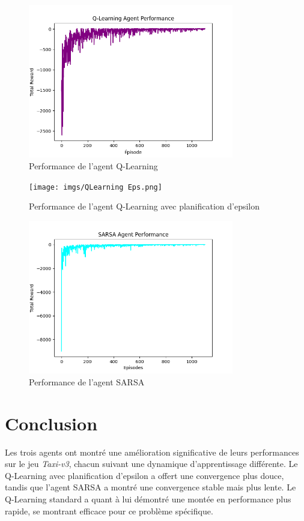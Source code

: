 \documentclass{article}
\begin{document}
\begin{figure}[H]
    \centering
    \includegraphics[width=0.8\textwidth]{imgs/QLearningAgent.png}
    \caption{Performance de l'agent Q-Learning}
\end{figure}

\begin{figure}[H]
    \centering
    \texttt{[image: imgs/QLearning Eps.png]}
    \caption{Performance de l'agent Q-Learning avec planification d'epsilon}
\end{figure}

\begin{figure}[H]
    \centering
    \includegraphics[width=0.8\textwidth]{imgs/SarsaAgent.png}
    \caption{Performance de l'agent SARSA}
\end{figure}

\section{Conclusion}

Les trois agents ont montré une amélioration significative de leurs performances sur le jeu \textit{Taxi-v3}, chacun suivant une dynamique d'apprentissage différente. Le Q-Learning avec planification d'epsilon a offert une convergence plus douce, tandis que l'agent SARSA a montré une convergence stable mais plus lente. Le Q-Learning standard a quant à lui démontré une montée en performance plus rapide, se montrant efficace pour ce problème spécifique.
\end{document}

